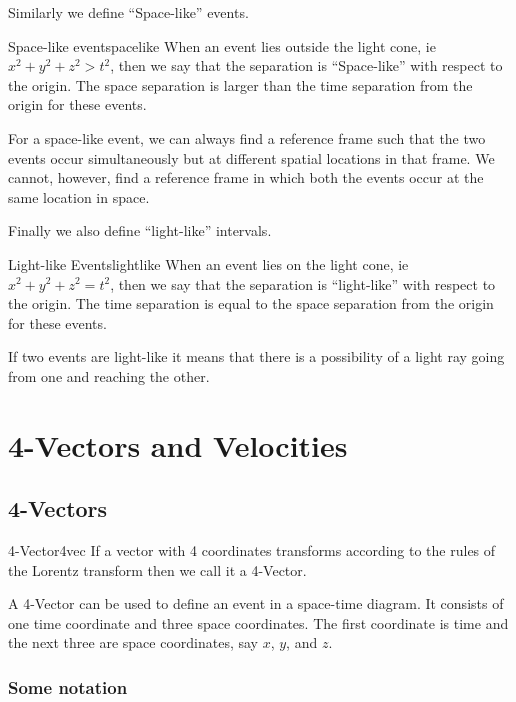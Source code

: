\documentclass[12pt]{article}
\numberwithin{equation}{section}
\theoremstyle{plain}
\theoremstyle{definition}
\begin{document}
Similarly we define ``Space-like'' events.

\begin{defn}{Space-like event}{spacelike}
    When an event lies outside the light cone, ie $x^2+y^2+z^2 > t^2$, then we say that the separation is ``Space-like'' with respect to the origin. The space separation is larger than the time separation from the origin for these events.
\end{defn}

For a space-like event, we can always find a reference frame such that the two events occur simultaneously but at different spatial locations in that frame. We cannot, however, find a reference frame in which both the events occur at the same location in space.

Finally we also define ``light-like'' intervals.

\begin{defn}{Light-like Events}{lightlike}
    When an event lies on the light cone, ie $x^2+y^2+z^2 = t^2$, then we say that the separation is ``light-like'' with respect to the origin. The time separation is equal to the space separation from the origin for these events.
\end{defn}

If two events are light-like it means that there is a possibility of a light ray going from one and reaching the other.

\section{4-Vectors and Velocities}

\subsection{4-Vectors}

\begin{defn}{4-Vector}{4vec}
    If a vector with 4 coordinates transforms according to the rules of the Lorentz transform then we call it a 4-Vector.
\end{defn}

A 4-Vector can be used to define an event in a space-time diagram. It consists of one time coordinate and three space coordinates. The first coordinate is time and the next three are space coordinates, say $x$, $y$, and $z$.

\subsubsection*{Some notation}
\end{document}
